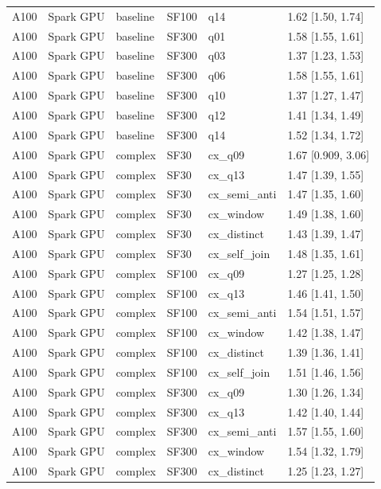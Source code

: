 \begin{longtable}{llllll}
A100 & Spark GPU & baseline & SF100 & q14 & 1.62 [1.50, 1.74] \\
A100 & Spark GPU & baseline & SF300 & q01 & 1.58 [1.55, 1.61] \\
A100 & Spark GPU & baseline & SF300 & q03 & 1.37 [1.23, 1.53] \\
A100 & Spark GPU & baseline & SF300 & q06 & 1.58 [1.55, 1.61] \\
A100 & Spark GPU & baseline & SF300 & q10 & 1.37 [1.27, 1.47] \\
A100 & Spark GPU & baseline & SF300 & q12 & 1.41 [1.34, 1.49] \\
A100 & Spark GPU & baseline & SF300 & q14 & 1.52 [1.34, 1.72] \\
A100 & Spark GPU & complex & SF30 & cx\_q09 & 1.67 [0.909, 3.06] \\
A100 & Spark GPU & complex & SF30 & cx\_q13 & 1.47 [1.39, 1.55] \\
A100 & Spark GPU & complex & SF30 & cx\_semi\_anti & 1.47 [1.35, 1.60] \\
A100 & Spark GPU & complex & SF30 & cx\_window & 1.49 [1.38, 1.60] \\
A100 & Spark GPU & complex & SF30 & cx\_distinct & 1.43 [1.39, 1.47] \\
A100 & Spark GPU & complex & SF30 & cx\_self\_join & 1.48 [1.35, 1.61] \\
A100 & Spark GPU & complex & SF100 & cx\_q09 & 1.27 [1.25, 1.28] \\
A100 & Spark GPU & complex & SF100 & cx\_q13 & 1.46 [1.41, 1.50] \\
A100 & Spark GPU & complex & SF100 & cx\_semi\_anti & 1.54 [1.51, 1.57] \\
A100 & Spark GPU & complex & SF100 & cx\_window & 1.42 [1.38, 1.47] \\
A100 & Spark GPU & complex & SF100 & cx\_distinct & 1.39 [1.36, 1.41] \\
A100 & Spark GPU & complex & SF100 & cx\_self\_join & 1.51 [1.46, 1.56] \\
A100 & Spark GPU & complex & SF300 & cx\_q09 & 1.30 [1.26, 1.34] \\
A100 & Spark GPU & complex & SF300 & cx\_q13 & 1.42 [1.40, 1.44] \\
A100 & Spark GPU & complex & SF300 & cx\_semi\_anti & 1.57 [1.55, 1.60] \\
A100 & Spark GPU & complex & SF300 & cx\_window & 1.54 [1.32, 1.79] \\
A100 & Spark GPU & complex & SF300 & cx\_distinct & 1.25 [1.23, 1.27] \\

\end{longtable}
